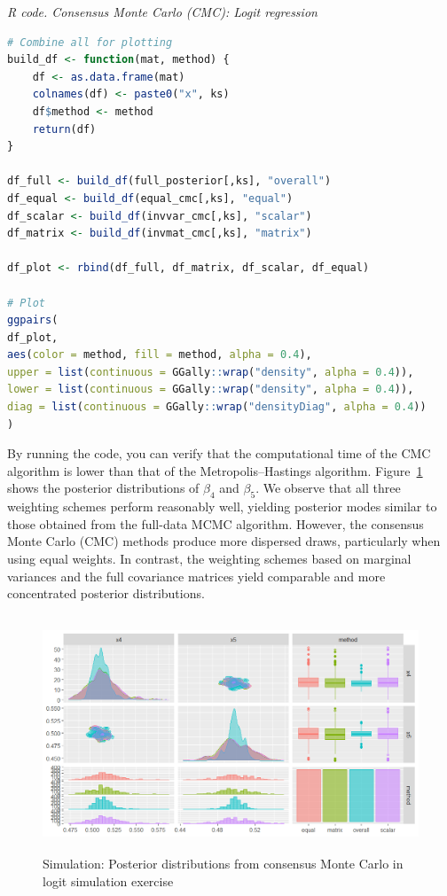 \begin{tcolorbox}[enhanced,width=4.67in,center upper,
	fontupper=\large\bfseries,drop shadow southwest,sharp corners]
	\textit{R code. Consensus Monte Carlo (CMC): Logit regression}
	\begin{VF}
		\begin{lstlisting}[language=R]
# Combine all for plotting
build_df <- function(mat, method) {
	df <- as.data.frame(mat)
	colnames(df) <- paste0("x", ks)
	df$method <- method
	return(df)
}

df_full <- build_df(full_posterior[,ks], "overall")
df_equal <- build_df(equal_cmc[,ks], "equal")
df_scalar <- build_df(invvar_cmc[,ks], "scalar")
df_matrix <- build_df(invmat_cmc[,ks], "matrix")

df_plot <- rbind(df_full, df_matrix, df_scalar, df_equal)

# Plot
ggpairs(
df_plot,
aes(color = method, fill = method, alpha = 0.4),
upper = list(continuous = GGally::wrap("density", alpha = 0.4)),
lower = list(continuous = GGally::wrap("density", alpha = 0.4)),
diag = list(continuous = GGally::wrap("densityDiag", alpha = 0.4))
)
\end{lstlisting}
	\end{VF}
\end{tcolorbox}

By running the code, you can verify that the computational time of the CMC algorithm is lower than that of the Metropolis–Hastings algorithm. Figure~\ref{CMCogit} shows the posterior distributions of \( \beta_4 \) and \( \beta_5 \). We observe that all three weighting schemes perform reasonably well, yielding posterior modes similar to those obtained from the full-data MCMC algorithm. However, the consensus Monte Carlo (CMC) methods produce more dispersed draws, particularly when using equal weights. In contrast, the weighting schemes based on marginal variances and the full covariance matrices yield comparable and more concentrated posterior distributions.

\begin{figure}[!h]
	\centering
	\includegraphics[width=340pt, height=200pt]{Chapters/chapter13/figures/CMC.png}
	\caption{Simulation: Posterior distributions from consensus Monte Carlo in logit simulation exercise}
	\label{CMCogit}
\end{figure} 



